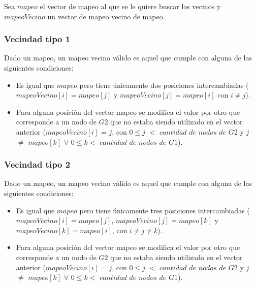 \noindent Sea $mapeo$ el vector de mapeo al que se le quiere buscar los vecinos y $mapeoVecino$ un vector de mapeo vecino de mapeo.


\subsubsection*{Vecindad tipo 1}
\noindent Dado un mapeo, un mapeo vecino válido es aquel que cumple con alguna de las siguientes condiciones:
\begin{itemize}
	\item Es igual que $mapeo$ pero tiene únicamente dos posiciones intercambiadas ($mapeoVecino[i] = mapeo[j]$ y $mapeoVecino[j] = mapeo[i]$ con $i \neq j$).
    \item Para alguna posición del vector mapeo se modifica el valor por otro que corresponde a un nodo de $G2$ que no estaba siendo utilizado en el vector anterior ($mapeoVecino[i]$ = $j$, con $ 0 \leq j$ $<$ $cantidad$ $de$ $nodos$ $de$ $G2$  y $j$ $\neq$ $mapeo[k]$ $\forall$ $0 \leq k <$ $cantidad$ $de$ $nodos$ $de$ $G1$).
\end{itemize}
\subsubsection*{Vecindad tipo 2}
\noindent Dado un mapeo, un mapeo vecino válido es aquel que cumple con alguna de las siguientes condiciones:
\begin{itemize}
	\item Es igual que $mapeo$ pero tiene únicamente tres posiciones intercambiadas ($mapeoVecino[i] = mapeo[j]$, $mapeoVecino[j] = mapeo[k]$ y $mapeoVecino[k] = mapeo[i]$, con $i \neq j \neq k$).
    \item Para alguna posición del vector mapeo se modifica el valor por otro que corresponde a un nodo de $G2$ que no estaba siendo utilizado en el vector anterior ($mapeoVecino[i]$ = $j$, con $ 0 \leq j$ $<$ $cantidad$ $de$ $nodos$ $de$ $G2$  y $j$ $\neq$ $mapeo[k]$ $\forall$ $0 \leq k <$ $cantidad$ $de$ $nodos$ $de$ $G1$).  
\end{itemize}

